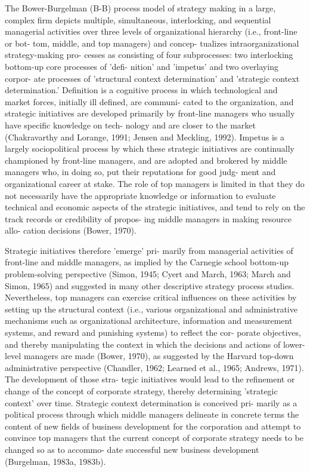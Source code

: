\documentclass[12pt,letterpaper]{article}
\begin{document}
The Bower-Burgelman (B-B) process model of strategy making in a large, complex firm depicts multiple, simultaneous, interlocking, and sequential managerial activities over three levels of organizational hierarchy (i.e., front-line or bot- tom, middle, and top managers) and concep- tualizes intraorganizational strategy-making pro- cesses as consisting of four subprocesses: two interlocking bottom-up core processes of 'defi- nition' and 'impetus' and two overlaying corpor- ate processes of 'structural context determination' and 'strategic context determination.' Definition is a cognitive process in which technological and market forces, initially ill defined, are communi- cated to the organization, and strategic initiatives are developed primarily by front-line managers who usually have specific knowledge on tech- nology and are closer to the market (Chakravarthy and Lorange, 1991; Jensen and Meckling, 1992). Impetus is a largely sociopolitical process by which these strategic initiatives are continually championed by front-line managers, and are adopted and brokered by middle managers who, in doing so, put their reputations for good judg- ment and organizational career at stake. The role of top managers is limited in that they do not necessarily have the appropriate knowledge or information to evaluate technical and economic aspects of the strategic initiatives, and tend to rely on the track records or credibility of propos- ing middle managers in making resource allo- cation decisions (Bower, 1970).

Strategic initiatives therefore 'emerge' pri- marily from managerial activities of front-line and middle managers, as implied by the Carnegie school bottom-up problem-solving perspective (Simon, 1945; Cyert and March, 1963; March and Simon, 1965) and suggested in many other descriptive strategy process studies. Nevertheless, top managers can exercise critical influences on these activities by setting up the structural context (i.e., various organizational and administrative mechanisms such as organizational architecture, information and measurement systems, and reward and punishing systems) to reflect the cor- porate objectives, and thereby manipulating the context in which the decisions and actions of lower-level managers are made (Bower, 1970), as suggested by the Harvard top-down administrative perspective (Chandler, 1962; Learned et al., 1965; Andrews, 1971). The development of those stra- tegic initiatives would lead to the refinement or change of the concept of corporate strategy, thereby determining 'strategic context' over time. Strategic context determination is conceived pri- marily as a political process through which middle managers delineate in concrete terms the content of new fields of business development for the corporation and attempt to convince top managers that the current concept of corporate strategy needs to be changed so as to accommo- date successful new business development (Burgelman, 1983a, 1983b).
\end{document}
